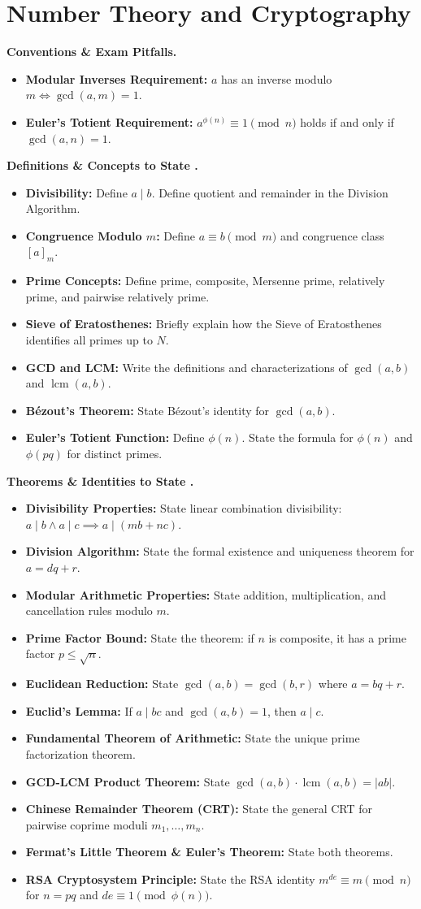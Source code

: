 \documentclass{natsirt}
\newcounter{topic}[section]
\newenvironment{recallbox}[1][]{%
    \begin{bluebox}[#1]\refstepcounter{topic}\textbf{Definitions \& Concepts to State \thesection.\thetopic}%
}{\end{bluebox}}
\newenvironment{theoremsbox}[1][]{%
    \begin{greenbox}[#1]\refstepcounter{topic}\textbf{Theorems \& Identities to State \thesection.\thetopic}%
}{\end{greenbox}}
\newenvironment{warningbox}[1][]{\begin{whitebox}[#1]\textbf{Conventions \& Exam Pitfalls. }}{\end{whitebox}}
\newcommand{\citem}{\item[$\square$]}
\begin{document}
\section{Number Theory and Cryptography}

\begin{warningbox}
    \begin{itemize}
        \citem \textbf{Modular Inverses Requirement:} $a$ has an inverse modulo $m \iff \gcd(a, m) = 1$.
        \citem \textbf{Euler's Totient Requirement:} $a^{\phi(n)} \equiv 1 \pmod n$ holds if and only if $\gcd(a, n) = 1$.
    \end{itemize}
\end{warningbox}

\begin{recallbox}
    \begin{itemize}
        \citem \textbf{Divisibility:} Define $a \mid b$. Define quotient and remainder in the Division Algorithm.
        \citem \textbf{Congruence Modulo $m$:} Define $a \equiv b \pmod m$ and congruence class $[a]_m$.
        \citem \textbf{Prime Concepts:} Define prime, composite, Mersenne prime, relatively prime, and pairwise relatively prime.
        \citem \textbf{Sieve of Eratosthenes:} Briefly explain how the Sieve of Eratosthenes identifies all primes up to $N$.
        \citem \textbf{GCD and LCM:} Write the definitions and characterizations of $\gcd(a, b)$ and $\operatorname{lcm}(a, b)$.
        \citem \textbf{B\'ezout's Theorem:} State B\'ezout's identity for $\gcd(a, b)$.
        \citem \textbf{Euler's Totient Function:} Define $\phi(n)$. State the formula for $\phi(n)$ and $\phi(pq)$ for distinct primes.
    \end{itemize}
\end{recallbox}

\begin{theoremsbox}
    \begin{itemize}
        \citem \textbf{Divisibility Properties:} State linear combination divisibility: $a \mid b \land a \mid c \implies a \mid (mb + nc)$.
        \citem \textbf{Division Algorithm:} State the formal existence and uniqueness theorem for $a = dq + r$.
        \citem \textbf{Modular Arithmetic Properties:} State addition, multiplication, and cancellation rules modulo $m$.
        \citem \textbf{Prime Factor Bound:} State the theorem: if $n$ is composite, it has a prime factor $p \le \sqrt{n}$.
        \citem \textbf{Euclidean Reduction:} State $\gcd(a, b) = \gcd(b, r)$ where $a = bq + r$.
        \citem \textbf{Euclid's Lemma:} If $a \mid bc$ and $\gcd(a, b) = 1$, then $a \mid c$.
        \citem \textbf{Fundamental Theorem of Arithmetic:} State the unique prime factorization theorem.
        \citem \textbf{GCD-LCM Product Theorem:} State $\gcd(a, b) \cdot \operatorname{lcm}(a, b) = |ab|$.
        \citem \textbf{Chinese Remainder Theorem (CRT):} State the general CRT for pairwise coprime moduli $m_1, \dots, m_n$.
        \citem \textbf{Fermat's Little Theorem \& Euler's Theorem:} State both theorems.
        \citem \textbf{RSA Cryptosystem Principle:} State the RSA identity $m^{de} \equiv m \pmod n$ for $n = pq$ and $de \equiv 1 \pmod{\phi(n)}$.
    \end{itemize}
\end{theoremsbox}
\end{document}
